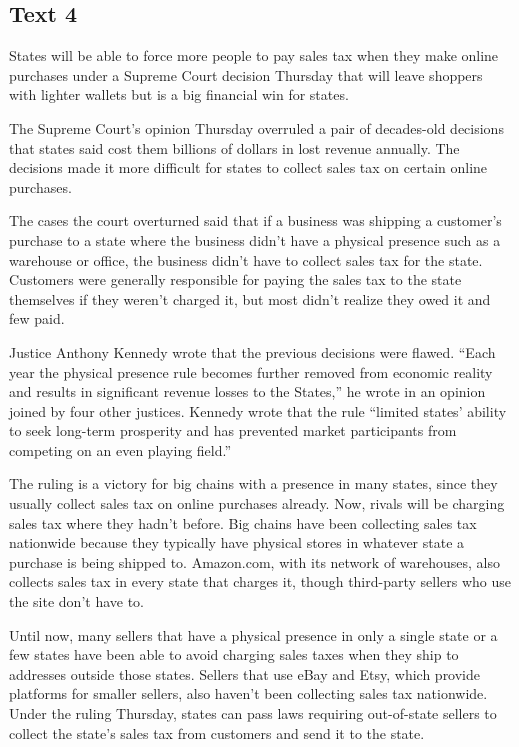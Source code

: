 \newpage

\subsection{Text 4}





States will be able to force more people to pay sales tax when
they make online purchases under a Supreme Court decision Thursday that
will leave shoppers with lighter wallets but is a big financial win for
states. 


The Supreme Court's opinion Thursday overruled a pair of
decades-old decisions that states said cost them billions of dollars in
lost revenue annually. The decisions made it more difficult for states
to collect sales tax on certain online purchases. 


The cases the
court overturned said that if a business was shipping a customer's
purchase to a state where the business didn't have a physical presence
such as a warehouse or office, the business didn't have to collect sales
tax for the state. Customers were generally responsible for paying the
sales tax to the state themselves if they weren't charged it, but most
didn't realize they owed it and few paid. 


Justice Anthony Kennedy
wrote that the previous decisions were flawed. ``Each year the physical
presence rule becomes further removed from economic reality and results
in significant revenue losses to the States,'' he wrote in an opinion
joined by four other justices. Kennedy wrote that the rule ``limited
states' ability to seek long-term prosperity and has prevented market
participants from competing on an even playing field.'' 


The ruling
is a victory for big chains with a presence in many states, since they
usually collect sales tax on online purchases already. Now, rivals will
be charging sales tax where they hadn't before. Big chains have been
collecting sales tax nationwide because they typically have physical
stores in whatever state a purchase is being shipped to. Amazon.com,
with its network of warehouses, also collects sales tax in every state
that charges it, though third-party sellers who use the site don't have
to. 



Until now, many sellers that have a physical presence in only
a single state or a few states have been able to avoid charging sales
taxes when they ship to addresses outside those states. Sellers that use
eBay and Etsy, which provide platforms for smaller sellers, also haven't
been collecting sales tax nationwide. Under the ruling Thursday, states
can pass laws requiring out-of-state sellers to collect the state's
sales tax from customers and send it to the state.


